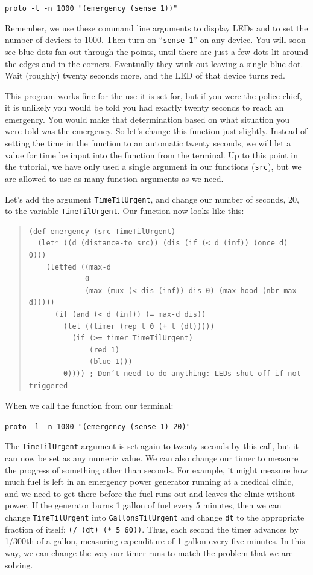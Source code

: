 \documentclass{article}
\newcommand\code[1]{\begin{center}\var{#1}\end{center}}
\newcommand\var[1]{{\tt #1}}
\newcommand\qvar[1]{``{\tt #1}''}
\begin{document}
\code{proto -l -n 1000 "(emergency (sense 1))"}

Remember, we use these command line arguments to display LEDs and to
set the number of devices to 1000.  Then turn on \qvar{sense 1} on any
device.  You will soon see blue dots fan out through the points, until
there are just a few dots lit around the edges and in the corners.
Eventually they wink out leaving a single blue dot.  Wait (roughly)
twenty seconds more, and the LED of that device turns red.

This program works fine for the use it is set for, but if you were the
police chief, it is unlikely you would be told you had exactly twenty
seconds to reach an emergency.  You would make that determination
based on what situation you were told was the emergency.  So let's
change this function just slightly.  Instead of setting the time in
the function to an automatic twenty seconds, we will let a value for
time be input into the function from the terminal.  Up to this point
in the tutorial, we have only used a single argument in our functions
(\var{src}), but we are allowed to use as many function arguments as we need.

Let's add the argument \var{TimeTilUrgent}, and change our number of
seconds, 20, to the variable \var{TimeTilUrgent}.  Our function now
looks like this:

\begin{quote}
\begin{verbatim}
(def emergency (src TimeTilUrgent)
  (let* ((d (distance-to src)) (dis (if (< d (inf)) (once d) 0))) 
    (letfed ((max-d 
             0 
             (max (mux (< dis (inf)) dis 0) (max-hood (nbr max-d)))))
      (if (and (< d (inf)) (= max-d dis))
        (let ((timer (rep t 0 (+ t (dt)))))
          (if (>= timer TimeTilUrgent)
              (red 1) 
              (blue 1)))
        0)))) ; Don’t need to do anything: LEDs shut off if not triggered
\end{verbatim}
\end{quote}

When we call the function from our terminal:

\code{proto -l -n 1000 "(emergency (sense 1) 20)"}

The \var{TimeTilUrgent} argument is set again to twenty seconds by
this call, but it can now be set as any numeric value.  We can also
change our timer to measure the progress of something other than
seconds.  For example, it might measure how much fuel is left in an
emergency power generator running at a medical clinic, and we need to
get there before the fuel runs out and leaves the clinic without
power.  If the generator burns 1 gallon of fuel every 5 minutes, then
we can change \var{TimeTilUrgent} into \var{GallonsTilUrgent} and
change \var{dt} to the appropriate fraction of itself: \var{(/ (dt) (*
  5 60))}.  Thus, each second the timer advances by 1/300th of a
gallon, measuring expenditure of 1 gallon every five minutes.  In this
way, we can change the way our timer runs to match the problem that we
are solving.
\end{document}

